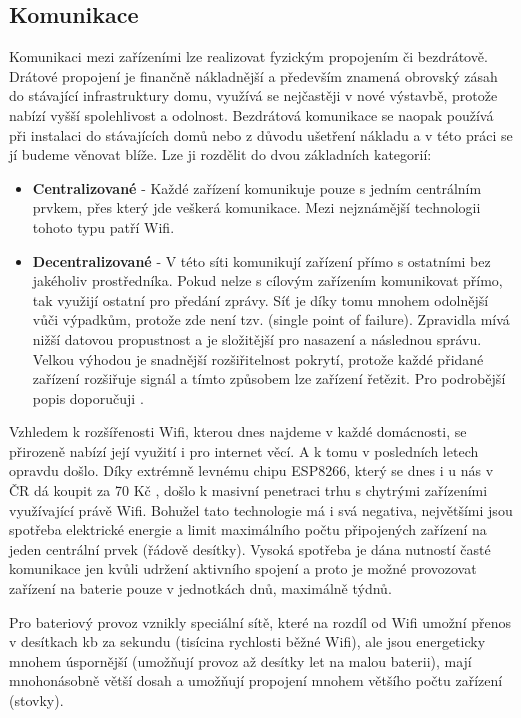 \subsection{Komunikace}
Komunikaci mezi zařízeními lze realizovat fyzickým propojením či bezdrátově. Drátové propojení je finančně nákladnější a především znamená obrovský zásah do stávající infrastruktury domu, využívá se nejčastěji v nové výstavbě, protože nabízí vyšší spolehlivost a odolnost. Bezdrátová komunikace se naopak používá při instalaci do stávajících domů nebo z důvodu ušetření nákladu a v této práci se jí budeme věnovat blíže. Lze ji rozdělit do dvou základních kategorií:
\begin{itemize}
    \item \textbf{Centralizované} - Každé zařízení komunikuje pouze s jedním centrálním prvkem, přes který jde veškerá komunikace. Mezi nejznámější technologii tohoto typu patří Wifi.
    \item \textbf{Decentralizované} - V této síti komunikují zařízení přímo s ostatními bez jakéholiv prostředníka. Pokud nelze s cílovým zařízením komunikovat přímo, tak využijí ostatní pro předání zprávy. Síť je díky tomu mnohem odolnější vůči výpadkům, protože zde není tzv.  (single point of failure). Zpravidla mívá nižší datovou propustnost a je složitější pro nasazení a následnou správu. Velkou výhodou je snadnější rozšiřitelnost pokrytí, protože každé přidané zařízení rozšiřuje signál a tímto způsobem lze zařízení řetězit. Pro podrobější popis doporučuji \cite{mesh}.
\end{itemize}
Vzhledem k rozšířenosti Wifi, kterou dnes najdeme v každé domácnosti, se přirozeně nabízí její využití i pro internet věcí. A k tomu v posledních letech opravdu došlo. Díky extrémně levnému chipu ESP8266, který se dnes i u nás v ČR dá koupit za 70 Kč \cite{hadex}, došlo k masivní penetraci trhu s chytrými zařízeními využívající právě Wifi. Bohužel tato technologie má i svá negativa, největšími jsou spotřeba elektrické energie a limit maximálního počtu připojených zařízení na jeden centrální prvek (řádově desítky). Vysoká spotřeba je dána nutností časté komunikace jen kvůli udržení aktivního spojení a proto je možné provozovat zařízení na baterie pouze v jednotkách dnů, maximálně týdnů.

Pro bateriový provoz vznikly speciální sítě, které na rozdíl od Wifi umožní přenos v desítkach kb za sekundu (tisícina rychlosti běžné Wifi), ale jsou energeticky mnohem úspornější \cite{Wifi-vs-ble} (umožňují provoz až desítky let na malou baterii), mají mnohonásobně větší dosah a umožňují propojení mnohem většího počtu zařízení (stovky).

